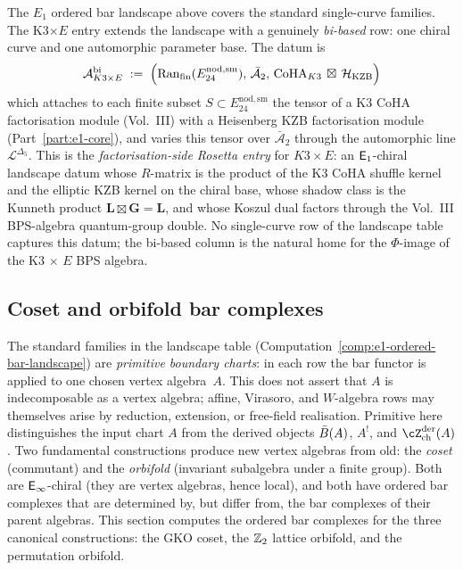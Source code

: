 \begin{remark}
\label{rem:rosetta-bi-based-ran-K3E}
%
%
The $E_1$ ordered bar landscape above covers the standard
single-curve families. The K3$\times E$ entry extends the landscape
with a genuinely \emph{bi-based} row: one chiral curve and one
automorphic parameter base. The datum is
\[
\mathcal{A}^{\mathrm{bi}}_{K3 \times E}
\;:=\;
\Bigl(
 \operatorname{Ran}_{\mathrm{fin}}(E^{\mathrm{nod,sm}}_{24}),\,
 \bar{\mathcal A}_2,\,
 \mathrm{CoHA}_{K3} \,\boxtimes\, \mathcal{H}_{\mathrm{KZB}}
\Bigr)
\]
which attaches to each finite subset
$S\subset E^{\mathrm{nod,sm}}_{24}$ the tensor of a K3 CoHA
factorisation module (Vol.~III) with a Heisenberg KZB factorisation
module (Part~\ref{part:e1-core}), and varies this tensor over
$\bar{\mathcal A}_2$ through the automorphic line
$\mathcal L^{\Delta_5}$. This is the \emph{factorisation-side
Rosetta entry} for $K3 \times E$: an $\mathsf{E}_1$-chiral landscape datum
whose $R$-matrix is the product of the K3 CoHA shuffle kernel and
the elliptic KZB kernel on the chiral base, whose shadow class is the Kunneth product
$\mathbf{L} \boxtimes \mathbf{G} = \mathbf{L}$, and whose Koszul
dual factors through the Vol.~III BPS-algebra quantum-group double.
No single-curve row of the landscape table captures this datum; the
bi-based column is the natural home for the $\Phi$-image of the
K3 $\times$ $E$ BPS algebra.
\end{remark}

\subsection{Coset and orbifold bar complexes}%
\label{subsec:coset-orbifold-bar}%
%
%
%

The standard families in the landscape table
(Computation~\ref{comp:e1-ordered-bar-landscape})
are \emph{primitive boundary charts}: in each row the bar functor is
applied to one chosen vertex algebra~$A$. This does not assert that
$A$ is indecomposable as a vertex algebra; affine, Virasoro, and
$W$-algebra rows may themselves arise by reduction, extension, or
free-field realisation. Primitive here distinguishes the input chart
$A$ from the derived objects $\bar{B}(A)$, $A^!$, and
$\cZ^{\mathrm{der}}_{\mathrm{ch}}(A)$.
Two fundamental constructions produce new vertex algebras from
old: the \emph{coset} (commutant) and the \emph{orbifold}
(invariant subalgebra under a finite group).
Both are $\mathsf{E}_{\infty}$-chiral (they are vertex algebras, hence local),
and both have ordered bar complexes that are determined by, but
differ from, the bar complexes of their parent algebras.
This section computes the ordered bar complexes for the three
canonical constructions: the GKO coset, the $\mathbb{Z}_2$ lattice
orbifold, and the permutation orbifold.

